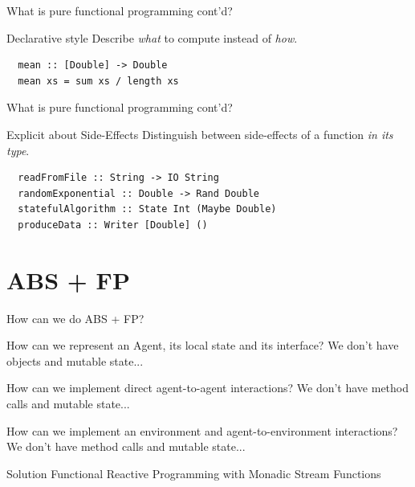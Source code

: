 \documentclass{beamer}
\begin{document}
\begin{frame}[fragile]{What is pure functional programming cont'd?}
  \begin{block}{Declarative style}
  	Describe \textit{what} to compute instead of \textit{how}.
  \end{block}
  
  \begin{block}{}
  \begin{verbatim}
  mean :: [Double] -> Double
  mean xs = sum xs / length xs
  \end{verbatim}
  \end{block}
\end{frame}
 
\begin{frame}[fragile]{What is pure functional programming cont'd?}
  \begin{block}{Explicit about Side-Effects}
  	Distinguish between side-effects of a function \textit{in its type}.
  \end{block}
  
  \begin{block}{}
  \begin{verbatim}
  readFromFile :: String -> IO String
  randomExponential :: Double -> Rand Double
  statefulAlgorithm :: State Int (Maybe Double)
  produceData :: Writer [Double] ()
  \end{verbatim}
  \end{block}
\end{frame}

\section{ABS + FP}
\begin{frame}{How can we do ABS + FP?}
  \begin{block}{How can we represent an Agent, its local state and its interface?}
	We don't have objects and mutable state...
  \end{block}
  
  \begin{block}{How can we implement direct agent-to-agent interactions?}
	We don't have method calls and mutable state...
  \end{block}
  
  \begin{block}{How can we implement an environment and agent-to-environment interactions?}
	We don't have method calls and mutable state...
  \end{block}
  
  \begin{block}{Solution}
  	Functional Reactive Programming with Monadic Stream Functions
  \end{block}
\end{frame}
\end{document}
